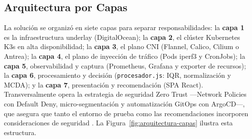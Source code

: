 \subsection{Arquitectura por Capas}

La solución se organizó en siete capas para separar responsabilidades: la \textbf{capa 1} es la infraestructura underlay (DigitalOcean); la \textbf{capa 2}, el clúster Kubernetes K3s en alta disponibilidad; la \textbf{capa 3}, el plano CNI (Flannel, Calico, Cilium o Antrea); la \textbf{capa 4}, el plano de inyección de tráfico (Pods iperf3 y CronJobs); la \textbf{capa 5}, observabilidad y captura (Prometheus, Grafana y exporter de recursos); la \textbf{capa 6}, procesamiento y decisión (\texttt{procesador.js}: IQR, normalización y MCDA); y la \textbf{capa 7}, presentación y recomendación (SPA React). Transversalmente opera la estrategia de seguridad Zero Trust ---Network Policies con Default Deny, micro-segmentación y automatización GitOps con ArgoCD---, que asegura que tanto el entorno de prueba como las recomendaciones incorporen consideraciones de seguridad \cite{ref16}. La Figura~\ref{fig:arquitectura-capas} ilustra esta estructura.

